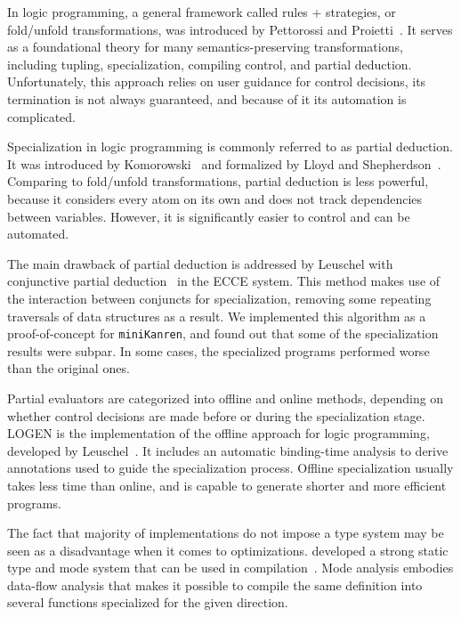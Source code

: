 \documentclass[crop=false]{standalone}
\begin{document}
In logic programming, a general framework called rules + strategies, or fold/unfold transformations, was introduced by Pettorossi and Proietti~\cite{pettorossi1996rules,pettorossi1994transformation}. 
It serves as a foundational theory for many semantics-preserving transformations, including tupling, specialization, compiling control, and partial deduction. 
Unfortunately, this approach relies on user guidance for control decisions, its termination is not always guaranteed, and because of it its automation is complicated. 

Specialization in logic programming is commonly referred to as partial deduction. 
It was introduced by Komorowski~\cite{komorowski1982partial} and formalized by Lloyd and Shepherdson~\cite{lloyd1991partial}. 
Comparing to fold/unfold transformations, partial deduction is less powerful, because it considers every atom on its own and does not track dependencies between variables. 
However, it is significantly easier to control and can be automated. 

The main drawback of partial deduction is addressed by Leuschel with conjunctive partial deduction~\cite{de1999conjunctive} in the ECCE system. 
This method makes use of the interaction between conjuncts for specialization, removing some repeating traversals of data structures as a result. 
We implemented this algorithm as a proof-of-concept for \texttt{miniKanren}, and found out that some of the specialization results were subpar.
In some cases, the specialized programs performed worse than the original ones. 

Partial evaluators are categorized into offline and online methods, depending on whether control decisions are made before or during the specialization stage. 
LOGEN is the implementation of the offline approach for logic programming, developed by Leuschel~\cite{leuschel2004offline}. 
It includes an automatic binding-time analysis to derive annotations used to guide the specialization process. 
Offline specialization usually takes less time than online, and is capable to generate shorter and more efficient programs. 

The fact that majority of \prolog implementations do not impose a type system may be seen as a disadvantage when it comes to optimizations. 
\merc developed a strong static type and mode system that can be used in compilation~\cite{overton2002constraint,overton2003precise}. 
Mode analysis embodies data-flow analysis that makes it possible to compile the same definition into several functions specialized for the given direction. 
\end{document}
